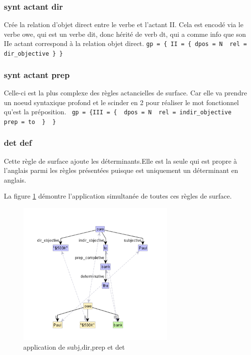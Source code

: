 \subsubsection{synt actant dir}
Crée la relation d'objet direct entre le verbe et l'actant II. Cela est encodé via le verbe owe, qui est un verbe dit, donc hérité de verb dt, qui a comme info que son IIe actant correspond à la relation objet direct.  \lstinline!gp = { II = { dpos = N  rel = dir_objective } }!

\subsubsection{synt actant prep}
Celle-ci est la plus complexe des règles actancielles de surface. Car elle va prendre un noeud syntaxique profond et le scinder en 2 pour réaliser le mot fonctionnel qu'est la préposition.  \lstinline! gp = {III = {  dpos = N  rel = indir_objective  prep = to  }  }!

\subsubsection{det def}

Cette règle de surface ajoute les déterminants.Elle est la seule qui est propre à l'anglais parmi les règles présentées puisque  est uniquement un déterminant en anglais.

La figure \ref{fig:syntsurf} démontre l'application simultanée de toutes ces règles de surface.

\begin{figure}[htb]
	\centering
	\includegraphics[width=0.7\textwidth, trim = {0cm 0cm 0cm 0cm},clip]{ch3/figs/rsynts_syntactisation.png}
	\caption{application de subj,dir,prep et det}
	\label{fig:syntsurf}
\end{figure}

